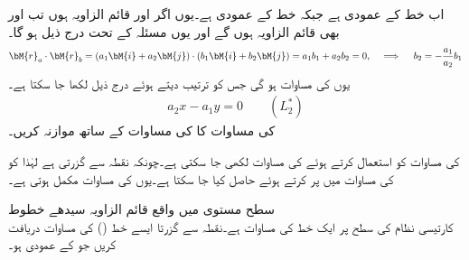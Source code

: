 اب  خط  کے عمودی ہے جبکہ  خط  کے عمودی ہے۔یوں اگر  اور  قائم الزاویہ ہوں تب  اور  بھی قائم الزاویہ ہوں گے اور یوں مسئلہ   کے تحت درج ذیل ہو گا۔
\begin{align*}
\bM{r}_a\cdot \bM{r}_b=(a_1\bM{i}+a_2\bM{j})\cdot(b_1\bM{i}+b_2\bM{j})=a_1b_1+a_2b_2=0,\quad \implies \quad b_2=-\frac{a_1}{a_2}b_1
\end{align*}
یوں  کی مساوات  ہو گی جس کو ترتیب دیتے ہوئے درج ذیل لکھا جا سکتا ہے۔
\begin{align}
a_2x-a_1y=0\quad \quad (L_2^*)
\end{align}
  کی مساوات کا  کی مساوات  کے ساتھ موازنہ کریں۔

 کی مساوات  کو استعمال کرتے ہوئے  کی مساوات  لکھی جا سکتی ہے۔چونکہ  نقطہ  سے گزرتی ہے لہٰذا  کو  کی مساوات میں پر کرتے ہوئے  حاصل کیا جا سکتا ہے۔یوں  کی مساوات مکمل ہوتی ہے۔

\quad سطح مستوی میں واقع قائم الزاویہ سیدھے خطوط\\
کارتیسی نظام کی   سطح پر ایک خط   کی مساوات  ہے۔نقطہ  سے گزرتا ایسے خط () کی مساوات دریافت کریں جو  کے عمودی ہو۔

